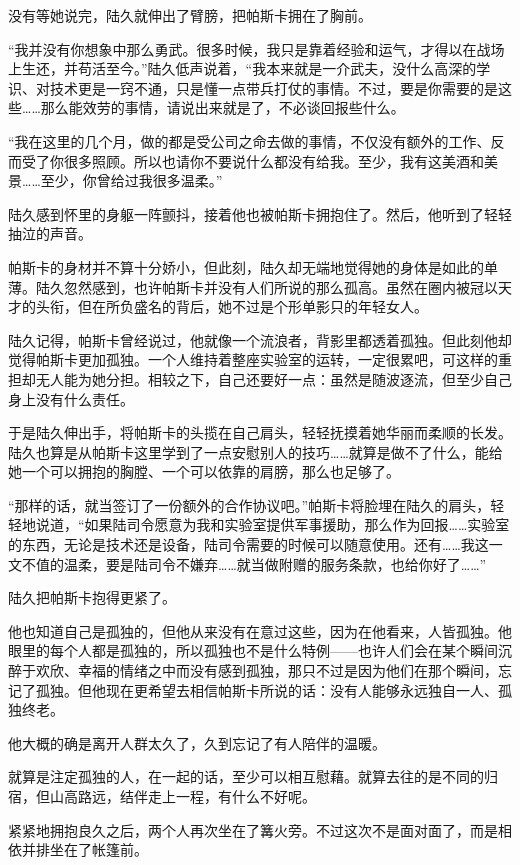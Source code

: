 没有等她说完，陆久就伸出了臂膀，把帕斯卡拥在了胸前。

“我并没有你想象中那么勇武。很多时候，我只是靠着经验和运气，才得以在战场上生还，并苟活至今。”陆久低声说着，“我本来就是一介武夫，没什么高深的学识、对技术更是一窍不通，只是懂一点带兵打仗的事情。不过，要是你需要的是这些……那么能效劳的事情，请说出来就是了，不必谈回报些什么。

“我在这里的几个月，做的都是受公司之命去做的事情，不仅没有额外的工作、反而受了你很多照顾。所以也请你不要说什么都没有给我。至少，我有这美酒和美景……至少，你曾给过我很多温柔。”

陆久感到怀里的身躯一阵颤抖，接着他也被帕斯卡拥抱住了。然后，他听到了轻轻抽泣的声音。

帕斯卡的身材并不算十分娇小，但此刻，陆久却无端地觉得她的身体是如此的单薄。陆久忽然感到，也许帕斯卡并没有人们所说的那么孤高。虽然在圈内被冠以天才的头衔，但在所负盛名的背后，她不过是个形单影只的年轻女人。

陆久记得，帕斯卡曾经说过，他就像一个流浪者，背影里都透着孤独。但此刻他却觉得帕斯卡更加孤独。一个人维持着整座实验室的运转，一定很累吧，可这样的重担却无人能为她分担。相较之下，自己还要好一点：虽然是随波逐流，但至少自己身上没有什么责任。

于是陆久伸出手，将帕斯卡的头揽在自己肩头，轻轻抚摸着她华丽而柔顺的长发。陆久也算是从帕斯卡这里学到了一点安慰别人的技巧……就算是做不了什么，能给她一个可以拥抱的胸膛、一个可以依靠的肩膀，那么也足够了。

“那样的话，就当签订了一份额外的合作协议吧。”帕斯卡将脸埋在陆久的肩头，轻轻地说道，“如果陆司令愿意为我和实验室提供军事援助，那么作为回报……实验室的东西，无论是技术还是设备，陆司令需要的时候可以随意使用。还有……我这一文不值的温柔，要是陆司令不嫌弃……就当做附赠的服务条款，也给你好了……”

陆久把帕斯卡抱得更紧了。

他也知道自己是孤独的，但他从来没有在意过这些，因为在他看来，人皆孤独。他眼里的每个人都是孤独的，所以孤独也不是什么特例——也许人们会在某个瞬间沉醉于欢欣、幸福的情绪之中而没有感到孤独，那只不过是因为他们在那个瞬间，忘记了孤独。但他现在更希望去相信帕斯卡所说的话：没有人能够永远独自一人、孤独终老。

他大概的确是离开人群太久了，久到忘记了有人陪伴的温暖。

就算是注定孤独的人，在一起的话，至少可以相互慰藉。就算去往的是不同的归宿，但山高路远，结伴走上一程，有什么不好呢。

紧紧地拥抱良久之后，两个人再次坐在了篝火旁。不过这次不是面对面了，而是相依并排坐在了帐篷前。

